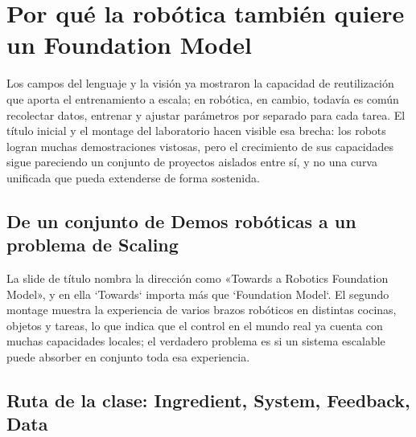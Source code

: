 \section{Por qué la robótica también quiere un Foundation Model}

Los campos del lenguaje y la visión ya mostraron la capacidad de reutilización que aporta el entrenamiento a escala; en robótica, en cambio, todavía es común recolectar datos, entrenar y ajustar parámetros por separado para cada tarea. El título inicial y el montage del laboratorio hacen visible esa brecha: los robots logran muchas demostraciones vistosas, pero el crecimiento de sus capacidades sigue pareciendo un conjunto de proyectos aislados entre sí, y no una curva unificada que pueda extenderse de forma sostenida.

\subsection{De un conjunto de Demos robóticas a un problema de Scaling}

La slide de título nombra la dirección como «Towards a Robotics Foundation Model», y en ella `Towards` importa más que `Foundation Model`. El segundo montage muestra la experiencia de varios brazos robóticos en distintas cocinas, objetos y tareas, lo que indica que el control en el mundo real ya cuenta con muchas capacidades locales; el verdadero problema es si un sistema escalable puede absorber en conjunto toda esa experiencia.




\subsection{Ruta de la clase: Ingredient, System, Feedback, Data}

